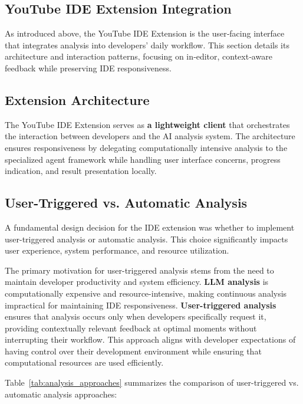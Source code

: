 \begin{spacing}{1.2}
\section{YouTube IDE Extension Integration}
As introduced above, the YouTube IDE Extension is the user‑facing interface that integrates analysis into developers' daily workflow. This section details its architecture and interaction patterns, focusing on in‑editor, context‑aware feedback while preserving IDE responsiveness.

\subsection{Extension Architecture}
The YouTube IDE Extension serves as \textbf{a lightweight client} that orchestrates the interaction between developers and the AI analysis system. The architecture ensures responsiveness by delegating computationally intensive analysis to the specialized agent framework while handling user interface concerns, progress indication, and result presentation locally.

\subsection{User-Triggered vs. Automatic Analysis}
A fundamental design decision for the IDE extension was whether to implement user-triggered analysis or automatic analysis. This choice significantly impacts user experience, system performance, and resource utilization.

The primary motivation for user-triggered analysis stems from the need to maintain developer productivity and system efficiency. \textbf{LLM analysis} is computationally expensive and resource-intensive, making continuous analysis impractical for maintaining IDE responsiveness. \textbf{User-triggered analysis} ensures that analysis occurs only when developers specifically request it, providing contextually relevant feedback at optimal moments without interrupting their workflow. This approach aligns with developer expectations of having control over their development environment while ensuring that computational resources are used efficiently.

Table~\ref{tab:analysis_approaches} summarizes the comparison of user-triggered vs. automatic analysis approaches:


\end{spacing}

